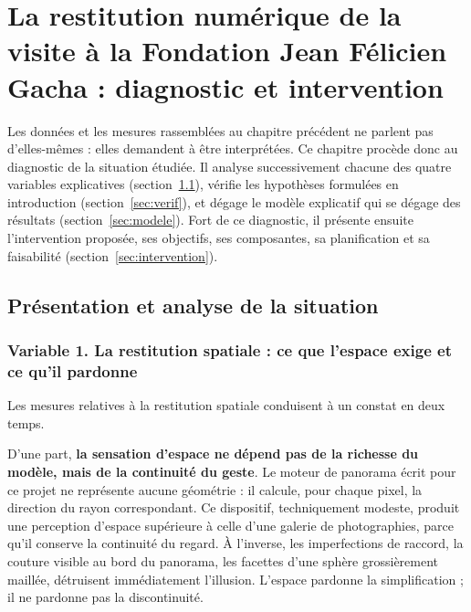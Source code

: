 \chapter{La restitution numérique de la visite à la Fondation Jean Félicien
Gacha : diagnostic et intervention}
\label{chap:diagnostic}

\introchap

Les données et les mesures rassemblées au chapitre précédent ne parlent pas
d'elles-mêmes : elles demandent à être interprétées. Ce chapitre procède donc au
diagnostic de la situation étudiée. Il analyse successivement chacune des quatre
variables explicatives (section~\ref{sec:analyse}), vérifie les hypothèses
formulées en introduction (section~\ref{sec:verif}), et dégage le modèle
explicatif qui se dégage des résultats (section~\ref{sec:modele}). Fort de ce
diagnostic, il présente ensuite l'intervention proposée, ses objectifs, ses
composantes, sa planification et sa faisabilité (section~\ref{sec:intervention}).

\section{Présentation et analyse de la situation}
\label{sec:analyse}

\subsection{Variable 1. La restitution spatiale : ce que l'espace exige et ce qu'il pardonne}

Les mesures relatives à la restitution spatiale conduisent à un constat en deux
temps.

D'une part, \textbf{la sensation d'espace ne dépend pas de la richesse du
modèle, mais de la continuité du geste}. Le moteur de panorama écrit pour ce
projet ne représente aucune géométrie : il calcule, pour chaque pixel, la
direction du rayon correspondant. Ce dispositif, techniquement modeste, produit
une perception d'espace supérieure à celle d'une galerie de photographies, parce
qu'il conserve la continuité du regard. À l'inverse, les imperfections de
raccord, la couture visible au bord du panorama, les facettes d'une sphère
grossièrement maillée, détruisent immédiatement l'illusion. L'espace pardonne
la simplification ; il ne pardonne pas la discontinuité.

